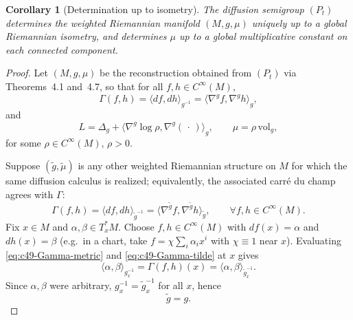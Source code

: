 \documentclass[11pt]{amsart}
\newtheorem{corollary}[theorem]{Corollary}
\theoremstyle{definition}
\theoremstyle{remark}
\begin{document}
\begin{corollary}[Determination up to isometry]\label{cor:4.9}
The diffusion semigroup $(P_t)$ determines the weighted Riemannian manifold $(M,g,\mu)$ uniquely
up to a global Riemannian isometry, and determines $\mu$ up to a global multiplicative constant on each
connected component.
\end{corollary}
\begin{proof}
Let $(M,g,\mu)$ be the reconstruction obtained from $(P_t)$ via Theorems~4.1 and~4.7, so that
for all $f,h\in C^\infty(M)$,
\begin{equation}\label{eq:c49-Gamma-metric}
\Gamma(f,h)=\langle df,dh\rangle_{g^{-1}}=\langle \nabla^g f,\nabla^g h\rangle_g,
\end{equation}
and
\begin{equation}\label{eq:c49-L-weighted}
L=\Delta_g+\langle \nabla^g\log\rho,\nabla^g(\,\cdot\,)\rangle_g,
\qquad
\mu=\rho\,\mathrm{vol}_g,
\end{equation}
for some $\rho\in C^\infty(M)$, $\rho>0$.

Suppose $(\widetilde g,\widetilde\mu)$ is any other weighted Riemannian structure on $M$ for which
the same diffusion calculus is realized; equivalently, the associated carré du champ agrees with
$\Gamma$:
\begin{equation}\label{eq:c49-Gamma-tilde}
\Gamma(f,h)=\langle df,dh\rangle_{\widetilde g^{-1}}
=\langle \nabla^{\widetilde g} f,\nabla^{\widetilde g} h\rangle_{\widetilde g},
\qquad \forall f,h\in C^\infty(M).
\end{equation}
Fix $x\in M$ and $\alpha,\beta\in T_x^*M$. Choose $f,h\in C^\infty(M)$ with $df(x)=\alpha$ and
$dh(x)=\beta$ (e.g.\ in a chart, take $f=\chi\sum_i\alpha_i x^i$ with $\chi\equiv 1$ near $x$).
Evaluating \eqref{eq:c49-Gamma-metric} and \eqref{eq:c49-Gamma-tilde} at $x$ gives
\[
\langle \alpha,\beta\rangle_{g^{-1}_x}
=\Gamma(f,h)(x)
=\langle \alpha,\beta\rangle_{\widetilde g^{-1}_x}.
\]
Since $\alpha,\beta$ were arbitrary, $g^{-1}_x=\widetilde g^{-1}_x$ for all $x$, hence
\begin{equation}\label{eq:c49-metrics-equal}
\widetilde g=g.
\end{equation}


\end{proof}
\end{document}
